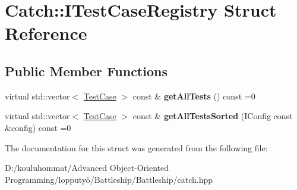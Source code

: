 \hypertarget{struct_catch_1_1_i_test_case_registry}{}\section{Catch\+:\+:I\+Test\+Case\+Registry Struct Reference}
\label{struct_catch_1_1_i_test_case_registry}
\subsection*{Public Member Functions}
\begin{DoxyCompactItemize}
\item 
\mbox{\label{struct_catch_1_1_i_test_case_registry_ad6e4d4a621655123f73ae98cfeda063d}} 
virtual std\+::vector$<$ \mbox{\hyperlink{class_catch_1_1_test_case}{Test\+Case}} $>$ const  \& {\bfseries get\+All\+Tests} () const =0
\item 
\mbox{\label{struct_catch_1_1_i_test_case_registry_a33e46639d0319d35497c05bb5d02be5a}} 
virtual std\+::vector$<$ \mbox{\hyperlink{class_catch_1_1_test_case}{Test\+Case}} $>$ const  \& {\bfseries get\+All\+Tests\+Sorted} (I\+Config const \&config) const =0
\end{DoxyCompactItemize}


The documentation for this struct was generated from the following file\+:\begin{DoxyCompactItemize}
\item 
D\+:/kouluhommat/\+Advanced Object-\/\+Oriented Programming/lopputyö/\+Battleship/\+Battleship/catch.\+hpp\end{DoxyCompactItemize}
